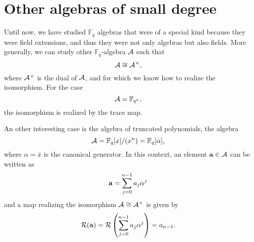 \documentclass[a4paper,11pt]{article}
\begin{document}
\section{Other algebras of small degree}

Until now, we have studied $\mathbb{F}_q$ algebras that were of a special kind
because they were field extensions, and thus they were not only algebras but
also fields. More generally, we can study other $\mathbb{F}_q$-algebra $\mathcal{A}$ such
that 
\[
  \mathcal{A} \cong \mathcal{A}^\times,
\]
where $\mathcal{A}^\times$ is the dual of $\mathcal{A}$, and for which we know how to realize the
isomorphism. For the case
\[
  \mathcal{A} = \mathbb{F}_{q^n},
\]
the isomorphism is realized by the trace map.

An other interesting case is the algebra of truncated polynomials, \ie the algebra
\[
  \mathcal{A} = \mathbb{F}_{q}[x]/(x^n) = \mathbb{F}_{q}[\alpha],
\]
where $\alpha=\bar x$ is the canonical generator.
In this context, an element $\mathbf{a}\in\mathcal{A}$ can be written as
\[
  \mathbf{a} = \sum_{j=0}^{n-1}a_j \alpha^j
\]
and a map realizing the isomorphism $\mathcal{A}\cong\mathcal{A}^\times$ is given by
\[
  \mathcal{R}(\mathbf{a})=\mathcal{R}\left(\sum_{j=0}^{n-1}a_j \alpha^j\right) = a_{n-1}.
\]
\end{document}
